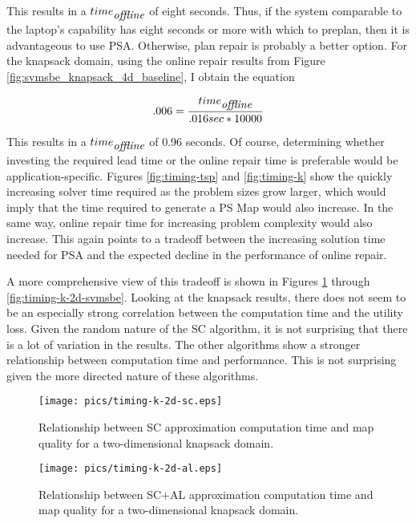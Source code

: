 This results in a $time_{\mbox{\itshape offline}}$ of eight seconds.  Thus, if the system comparable to the laptop's capability has eight seconds or more with which to preplan, then it is advantageous to use PSA.  Otherwise, plan repair is probably a better option.  For the knapsack domain, using the online repair results from Figure \ref{fig:svmsbe_knapsack_4d_baseline}, I obtain the equation

\begin{equation*}
.006 = \frac{time_{\mbox{\itshape offline}}}{.016sec * 10000}
\end{equation*}

This results in a $time_{\mbox{\itshape offline}}$ of 0.96 seconds.  Of course, determining whether investing the required lead time or the online repair time is preferable would be application-specific.  Figures \ref{fig:timing-tsp} and \ref{fig:timing-k} show the quickly increasing solver time required as the problem sizes grow larger, which would imply that the time required to generate a PS Map would also increase.  In the same way, online repair time for increasing problem complexity would also increase.  This again points to a tradeoff between the increasing solution time needed for PSA and the expected decline in the performance of online repair.

A more comprehensive view of this tradeoff is shown in Figures \ref{fig:timing-k-2d-sc} through \ref{fig:timing-k-2d-svmsbe}.  Looking at the knapsack results, there does not seem to be an especially strong correlation between the computation time and the utility loss.  Given the random nature of the SC algorithm, it is not surprising that there is a lot of variation in the results.  The other algorithms show a stronger relationship between computation time and performance.  This is not surprising given the more directed nature of these algorithms.  






\begin{figure}
\begin{center}
\texttt{[image: pics/timing-k-2d-sc.eps]}
\caption{Relationship between SC approximation computation time and map quality for a two-dimensional knapsack domain.}
\label{fig:timing-k-2d-sc}
\end{center}
\end{figure}


\begin{figure}
\begin{center}
\texttt{[image: pics/timing-k-2d-al.eps]}
\caption{Relationship between SC+AL approximation computation time and map quality for a two-dimensional knapsack domain.}
\label{fig:timing-k-2d-al}
\end{center}
\end{figure}

